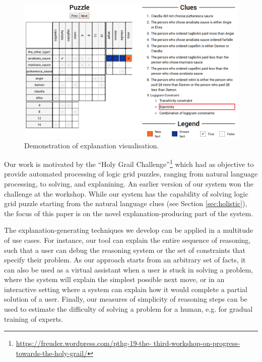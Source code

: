 \begin{figure}[h]
\centering
\includegraphics[width=0.8\linewidth]{zebra_screen}
\caption{Demonstration of explanation visualisation.}
\label{fig:zebrascreen}
\end{figure}

Our work is motivated by the ``Holy Grail Challenge''\footnote{\tiny \url{https://freuder.wordpress.com/pthg-19-the- third-workshop-on-progress-towards-the-holy-grail/}} which had as objective to provide automated processing of logic grid puzzles, ranging from natural language processing, to solving, and explanining. 
An earlier version of our system won the challenge at the workshop. 
While our system has the capability of solving logic grid puzzle starting from the natural language clues (see Section \ref{sec:holistic}), the focus of this paper is on the novel explanation-producing part of the system.

The explanation-generating techniques we develop can be applied in a multitude of use cases. 
For instance, our tool can explain the entire sequence of reasoning, such that a user can debug the reasoning system or the set of constraints that specify their problem. 
As our approach starts from an arbitrary set of facts, it can also be used as a virtual assistant when a user is stuck in solving a problem, where the system will explain the simplest possible next move, or in an interactive setting where a system can explain how it would complete a partial solution of a user.
Finally, our measures of simplicity of reasoning steps can be used to estimate the difficulty of solving a problem for a human, e.g. for gradual training of experts.

